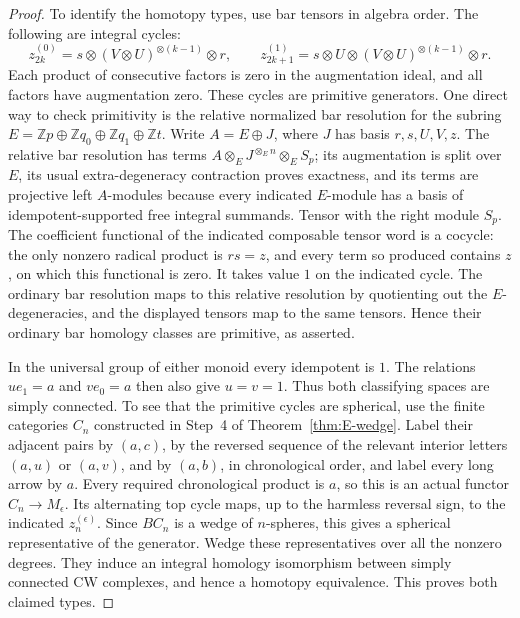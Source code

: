 \begin{proof}
To identify the homotopy types, use bar tensors in algebra order.
The following are integral cycles:
\[
 z_{2k}^{(0)}=s\otimes(V\otimes U)^{\otimes(k-1)}\otimes r,
 \qquad
 z_{2k+1}^{(1)}=s\otimes U\otimes
                  (V\otimes U)^{\otimes(k-1)}\otimes r.
\]
Each product of consecutive factors is zero in the augmentation
ideal, and all factors have augmentation zero.
These cycles are primitive generators.  One direct way to check
primitivity is the relative normalized bar resolution for the
subring
$E=\mathbb Zp\oplus\mathbb Zq_0\oplus\mathbb Zq_1\oplus\mathbb Zt$.
Write $A=E\oplus J$, where $J$ has basis $r,s,U,V,z$.
The relative bar resolution has terms
$A\otimes_E J^{\otimes_E n}\otimes_E S_p$; its augmentation
is split over $E$, its usual extra-degeneracy contraction proves
exactness, and its terms are projective left $A$-modules because
every indicated $E$-module has a basis of idempotent-supported
free integral summands.  Tensor with the right module $S_p$.
The coefficient functional of the indicated composable tensor
word is a cocycle: the only nonzero radical product is $rs=z$,
and every term so produced contains $z$, on which this functional
is zero.  It takes value $1$ on the indicated cycle.  The ordinary
bar resolution maps to this relative resolution by quotienting
out the $E$-degeneracies, and the displayed tensors map to the
same tensors.  Hence their ordinary bar homology classes are
primitive, as asserted.

In the universal group of either monoid every idempotent is $1$.
The relations $ue_1=a$ and $ve_0=a$ then also give $u=v=1$.
Thus both classifying spaces are simply connected.  To see that
the primitive cycles are spherical, use the finite categories
$C_n$ constructed in Step~4 of Theorem~\ref{thm:E-wedge}.
Label their adjacent pairs by $(a,c)$, by the reversed sequence
of the relevant interior letters $(a,u)$ or $(a,v)$, and by
$(a,b)$, in chronological order, and label every long arrow by
$a$.  Every required chronological product is $a$, so this is
an actual functor $C_n\to M_\epsilon$.
Its alternating top cycle maps, up to the harmless reversal sign,
to the indicated $z_n^{(\epsilon)}$.
Since $BC_n$ is a wedge of $n$-spheres, this gives a spherical
representative of the generator.  Wedge these representatives
over all the nonzero degrees.  They induce an integral homology
isomorphism between simply connected CW complexes, and hence a
homotopy equivalence.  This proves both claimed types.
\end{proof}

